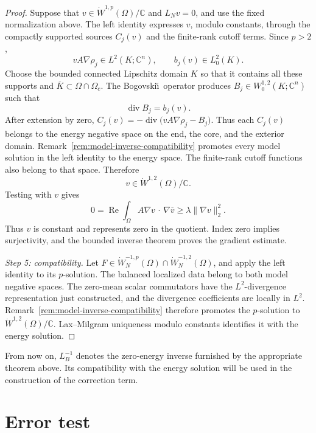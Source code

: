 \documentclass[12pt]{amsart}
\newcommand{\cdo}{\, \cdot \,}
\newcommand{\diver}{\operatorname{div}}
\theoremstyle{remark}
\begin{document}
\begin{proof}
Suppose that \(v\in\dot W^{1,p}(\Omega)/\mathbb C\) and \(L_Nv=0\), and use the fixed normalization above.  The left identity expresses \(v\),
modulo constants, through the compactly supported sources \(C_j(v)\) and the finite-rank cutoff terms.  Since \(p>2\),
\[
 vA\nabla\rho_j\in L^2(K;\mathbb C^n),
 \qquad b_j(v)\in L^2_0(K).
\]
Choose the bounded connected Lipschitz domain \(K\) so that it
contains all these supports and
\(\overline K\subset\Omega\cap\Omega_c\).  The Bogovski\u\i\
operator produces \(B_j\in W^{1,2}_0(K;\mathbb C^n)\) such that
\[
 \diver B_j=b_j(v).
\]
After extension by zero, $C_j(v)=-\diver\bigl(vA\nabla\rho_j-B_j\bigr)$. Thus each \(C_j(v)\) belongs to the energy negative space on the end, the core, and the exterior domain.  Remark~\ref{rem:model-inverse-compatibility} promotes every model solution in the left identity to the energy space. The finite-rank cutoff functions also belong to that space.  Therefore
\[
 v\in\dot W^{1,2}(\Omega)/\mathbb C.
\]
Testing with \(v\) gives
\[
 0=\operatorname{Re}\int_\Omega
 A\nabla v\mathbin{\cdo}\nabla\overline v
 \geq\lambda\|\nabla v\|_2^2.
\]
Thus \(v\) is constant and represents zero in the quotient.  Index zero
implies surjectivity, and the bounded inverse theorem proves the gradient
estimate.

\emph{Step 5: compatibility.}
Let
\(F\in\dot W^{-1,p}_N(\Omega)\cap\dot W^{-1,2}_N(\Omega)\), and apply the
left identity to its \(p\)-solution.  The balanced localized data belong
to both model negative spaces.  The zero-mean scalar commutators have the
\(L^2\)-divergence representation just constructed, and the divergence
coefficients are locally in \(L^2\).  Remark~\ref{rem:model-inverse-compatibility}
therefore promotes the \(p\)-solution to
\(\dot W^{1,2}(\Omega)/\mathbb C\).  Lax--Milgram uniqueness modulo
constants identifies it with the energy solution.
\end{proof}

From now on, \(L_B^{-1}\) denotes the zero-energy inverse furnished by the
appropriate theorem above. Its
compatibility with the energy solution will be used in the construction
of the correction term.

\section{Error test}
\label{sec:forward-caccioppoli}


\end{document}
